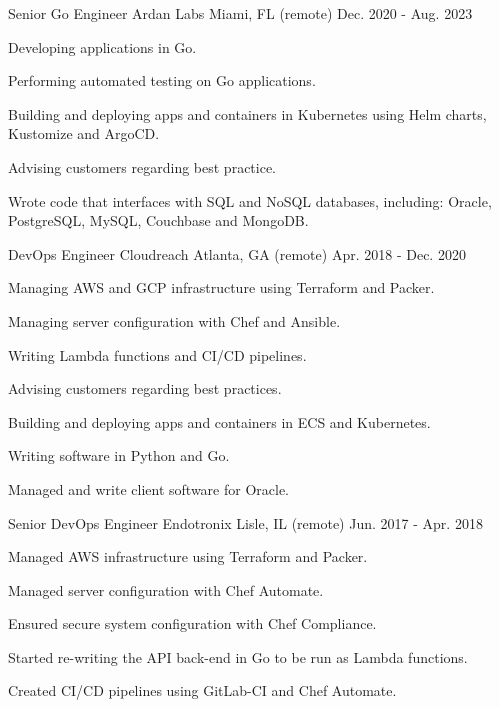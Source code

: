 \begin{cventries}
\cventry
{Senior Go Engineer}
{Ardan Labs}
{Miami, FL (remote)}
{Dec. 2020 - Aug. 2023}
{
\begin{cvitems}
\item {Developing applications in Go.}
\item {Performing automated testing on Go applications.}
\item {Building and deploying apps and containers in Kubernetes using Helm charts, Kustomize and ArgoCD.}
\item {Advising customers regarding best practice.}
\item {Wrote code that interfaces with SQL and NoSQL databases, including: Oracle, PostgreSQL, MySQL, Couchbase and MongoDB.}
\end{cvitems}
}

\cventry
{DevOps Engineer}
{Cloudreach}
{Atlanta, GA (remote)}
{Apr. 2018 - Dec. 2020}
{
\begin{cvitems}
\item {Managing AWS and GCP infrastructure using Terraform and Packer.}
\item {Managing server configuration with Chef and Ansible.}
\item {Writing Lambda functions and CI/CD pipelines.}
\item {Advising customers regarding best practices.}
\item {Building and deploying apps and containers in ECS and Kubernetes.}
\item {Writing software in Python and Go.}
\item {Managed and write client software for Oracle.}
\end{cvitems}
}

\cventry
{Senior DevOps Engineer}
{Endotronix}
{Lisle, IL (remote)}
{Jun. 2017 - Apr. 2018}
{
\begin{cvitems}
\item {Managed AWS infrastructure using Terraform and Packer.}
\item {Managed server configuration with Chef Automate.}
\item {Ensured secure system configuration with Chef Compliance.}
\item {Started re-writing the API back-end in Go to be run as Lambda functions.}
\item {Created CI/CD pipelines using GitLab-CI and Chef Automate.}
\end{cvitems}
}


\end{cventries}
